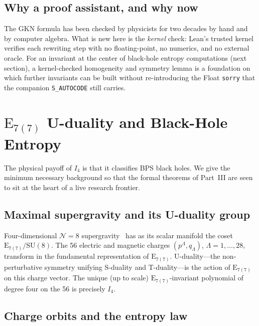 \documentclass[11pt]{article}
\theoremstyle{definition}
\newcommand{\Iq}{I_4}
\newcommand{\Esevenc}{\mathrm{E}_{7(7)}}
\begin{document}
\subsection{Why a proof assistant, and why now}
\label{sec:gkn-why}

The GKN formula has been checked by physicists for two decades by hand and by
computer algebra. What is new here is the \emph{kernel} check: Lean's trusted
kernel verifies each rewriting step with no floating-point, no numerics, and no
external oracle. For an invariant at the center of black-hole entropy
computations (next section), a kernel-checked homogeneity and symmetry lemma is
a foundation on which further invariants can be built without re-introducing the
Float \texttt{sorry} that the companion \texttt{S\_AUTOCODE} still carries.

\section{$\mathrm{E}_{7(7)}$ U-duality and Black-Hole Entropy}
\label{sec:udu}

The physical payoff of $\Iq$ is that it classifies BPS black holes. We give the
minimum necessary background so that the formal theorems of Part~III are seen
to sit at the heart of a live research frontier.

\subsection{Maximal supergravity and its U-duality group}
\label{sec:udu-group}

Four-dimensional $\mathcal{N}=8$ supergravity~\cite{cremmerjulia1979} has as
its scalar manifold the coset $\Esevenc/\mathrm{SU}(8)$. The 56 electric and
magnetic charges $(p^\Lambda, q_\Lambda)$, $\Lambda=1,\dots,28$, transform in
the fundamental representation of $\Esevenc$. U-duality---the non-perturbative
symmetry unifying S-duality and T-duality---is the action of $\Esevenc$ on this
charge vector. The unique (up to scale) $\Esevenc$-invariant polynomial of
degree four on the 56 is precisely $\Iq$.

\subsection{Charge orbits and the entropy law}
\label{sec:udu-entropy}
\end{document}
